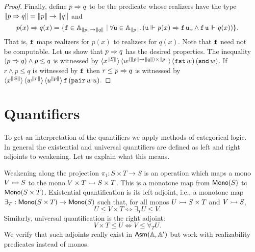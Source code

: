 \begin{proof}
  Finally, define $p \Rightarrow q$ to be the predicate whose realizers have
  the type $\|p \Rightarrow q\| = \|p\| \to \|q\|$ and
  \begin{equation*}
    p(x) \Rightarrow q(x) = \{
      \mathtt{f} \in \mathbb{A}_{\|p\| \to \|q\|} \mid
      \forall \mathtt{u} \in \mathbb{A}_{\|p\|} .\,
        (\mathtt{u} \Vdash_{} p(x)
        \Rightarrow
        \mathtt{f}\,\mathtt{u}{\downarrow} \land
        \mathtt{f}\,\mathtt{u} \Vdash_{} q(x))
    \}.
  \end{equation*}
  That is, $\mathtt{f}$ maps realizers for $p(x)$ to realizers for $q(x)$.
  Note that $\mathtt{f}$ need not be computable. Let us show that $p \Rightarrow
  q$ has the desired properties. The inequality $(p \Rightarrow q) \land p
  \leq q$ is witnessed by $\langle x^{\|S\|} \rangle\, \langle w^{(\|p\| \to
      \|q\|) \times \|p\|} \rangle\,{(\mathtt{fst}\,w)\, (\mathtt{snd}\,w)}$. If $r \land p
  \leq q$ is witnessed by $\mathtt{f}$ then $r \leq p \Rightarrow q$ is witnessed
  by $\langle x^{\|S\|} \rangle\, \langle w^{\|r\|} \rangle\,
    \langle u^{\|p\|} \rangle\, \mathtt{f}\,(\mathtt{pair}\,w\,u)$.
\end{proof}

\section{Quantifiers}
\label{sec:quantifiers}

To get an interpretation of the quantifiers we apply methods of
categorical logic. In general the existential and universal
quantifiers are defined as left and right adjoints to weakening. Let
us explain what this means.

Weakening along the projection $\pi_1 : S \times T \to
S$ is an operation which maps a mono $V \rightarrowtail S$
to the mono $V \times T \rightarrowtail S \times T$.
This is a monotone map from $\mathsf{Mono}(S)$ to $\mathsf{Mono}(S \times
  T)$. Existential quantification is its left adjoint, i.e., a
monotone map $\exists_{T} : \mathsf{Mono}(S \times T) \to
\mathsf{Mono}(S)$ such that, for all monos $U \rightarrowtail S
\times T$ and $V \rightarrowtail S$,
%
\begin{equation*}
  U \leq V \times T
  \iff
  \exists_{T} U \leq V.
\end{equation*}
%
Similarly, universal quantification is the right adjoint:
%
\begin{equation*}
  V \times T \leq U
  \iff
  V \leq \forall_{T} U.
\end{equation*}
%
We verify that such adjoints really exist in $\mathsf{Asm}(\mathbb{A},\mathbb{A}')$ but work with
realizability predicates instead of monos.

